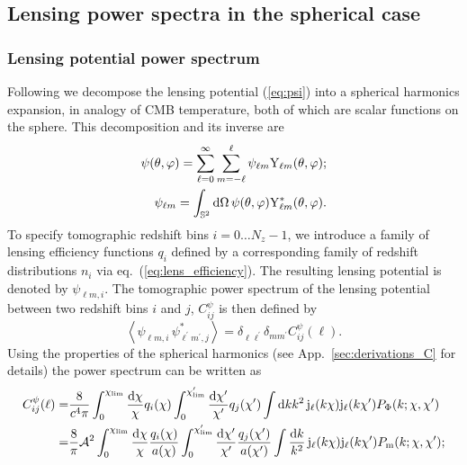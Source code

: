 \documentclass[fleqn,usenatbib]{mnras} %
\newcommand{\pref}{{\cal A}}
\begin{document}
\subsection{Lensing power spectra in the spherical case}

\subsubsection{Lensing potential power spectrum}

Following \cite{2000PhRvD..62d3007H} we decompose the lensing potential
(\ref{eq:psi}) into a spherical harmonics expansion, in analogy of CMB
temperature, both of which are scalar functions on the sphere. This
decomposition and its inverse are
%
%
\begin{align}
  \psi(\theta, \varphi) = \sum_{\ell=0}^\infty \sum_{m=-\ell}^\ell \psi_{\ell m} {\rm Y}_{\ell m}(\theta, \varphi);
    \label{eq:psi_harm_exp}
    \\
  \psi_{\ell m} = \int_{\mathbb{S}^2} {\rm d} \Omega \, \psi(\theta, \varphi) {\rm Y}^\ast_{\ell m}(\theta, \varphi).
  \label{eq:psi_harm_exp_inv}
\end{align}
%
To specify tomographic redshift bins $i=0\ldots N_z-1$, we introduce a family
of lensing efficiency functions $q_i$ defined by a corresponding family of
redshift distributions $n_i$ via eq.~(\ref{eq:lens_efficiency}). The resulting
lensing potential is denoted by $\psi_{\ell m, i}$. The tomographic power
spectrum of the lensing potential between two redshift bins $i$ and $j$,
$C_{ij}^\psi$ is then defined by \cite{pee80}
%
\begin{equation}
  \left\langle \psi^{}_{\ell m, i} \, \psi^\ast_{\ell^\prime m^\prime, j} \right\rangle
    = \delta_{\ell \ell^\prime} \delta_{m m^\prime} C^\psi_{ij}(\ell) .
  \label{eq:C_ell_psi}
\end{equation}
%
Using the properties of the spherical harmonics (see
App.~\ref{sec:derivations_C} for details) the power spectrum can be written as
%
\begin{align}
  C_{ij}^\psi(\ell) = & \frac 8 {c^4 \pi} 
  \int_0^{\chi_{\rm lim}} \frac{{\rm d}\chi}{\chi} q_i(\chi)
  \int_0^{\chi^\prime_{\rm lim}} \frac{{\rm d}\chi^\prime}{\chi^\prime} q_j(\chi^\prime)
  \int {\rm d} k k^2 \, {\rm j}_\ell(k \chi) {\rm j}_\ell(k \chi^\prime) P_\Phi(k; \chi, \chi^\prime)
  \label{eq:C_ell_phi_Pphi} \\
  = & \frac 8 \pi \pref^2
  \int_0^{\chi_{\rm lim}} \frac{{\rm d}\chi}{\chi} \frac{q_i(\chi)}{a(\chi)}
  \int_0^{\chi^\prime_{\rm lim}} \frac{{\rm d}\chi^\prime}{\chi^\prime} \frac{q_j(\chi^\prime)}{a(\chi^\prime)}
  \int \frac{{\rm d} k}{k^2} \, {\rm j}_\ell(k \chi) {\rm j}_\ell(k \chi^\prime) P_{\rm m}(k; \chi, \chi^\prime) ;
  \label{eq:C_ell_phi_Pm}
\end{align}
\end{document}
